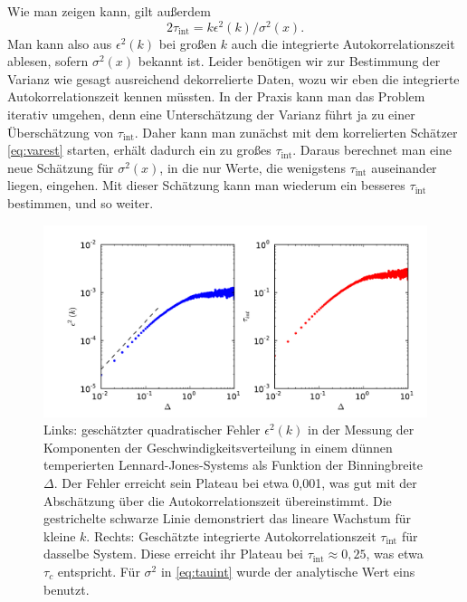 Wie man zeigen kann, gilt außerdem~\cite{janke02a}
\begin{equation}
  \label{eq:tauint}
  2\tau_\text{int} = k \epsilon^2(k)/\sigma^2(x).
\end{equation}
Man kann also aus $\epsilon^2(k)$ bei großen $k$ auch die integrierte
Autokorrelationszeit ablesen, sofern $\sigma^2(x)$ bekannt ist. Leider
benötigen wir zur Bestimmung der Varianz wie gesagt ausreichend
dekorrelierte Daten, wozu wir eben die integrierte
Autokorrelationszeit kennen müssten. In der Praxis kann man das
Problem iterativ umgehen, denn eine Unterschätzung der Varianz führt
ja zu einer Überschätzung von $\tau_\text{int}$. Daher kann man
zunächst mit dem korrelierten Schätzer \eqref{eq:varest} starten,
erhält dadurch ein zu großes $\tau_\text{int}$. Daraus berechnet man
eine neue Schätzung für $\sigma^2(x)$, in die nur Werte, die
wenigstens $\tau_\text{int}$ auseinander liegen, eingehen. Mit dieser
Schätzung kann man wiederum ein besseres  $\tau_\text{int}$ bestimmen,
und so weiter.

\begin{figure}
  \centering
  \includegraphics[width=\textwidth]{plots/binning}
  \caption{Links: geschätzter quadratischer Fehler $\epsilon^2(k)$ in
    der Messung der Komponenten der Geschwindigkeitsverteilung in
    einem dünnen temperierten Lennard-Jones-Systems als Funktion der
    Binningbreite $\Delta$. Der Fehler erreicht sein Plateau bei etwa
    0,001, was gut mit der Abschätzung über die Autokorrelationszeit
    übereinstimmt.  Die gestrichelte schwarze Linie demonstriert das
    lineare Wachstum für kleine $k$. Rechts: Geschätzte integrierte
    Autokorrelationszeit $\tau_\text{int}$ für dasselbe System.  Diese
    erreicht ihr Plateau bei $\tau_\text{int} \approx 0,25$, was etwa
    $\tau_c$ entspricht. Für $\sigma^2$ in \eqref{eq:tauint} wurde der
    analytische Wert eins benutzt. }
  \label{fig:binning}
\end{figure}

